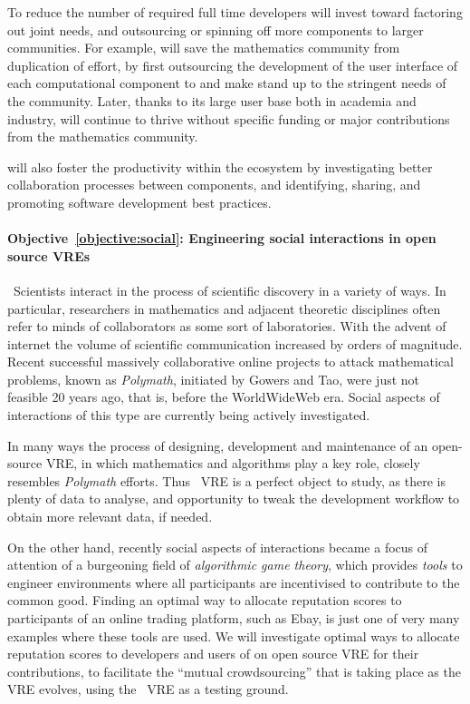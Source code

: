\documentclass[noworkareas,deliverables,\classoptions]{euproposal}       %
\begin{document}
\begin{proposal}

To reduce the number of required full time developers \TheProject will
invest toward factoring out joint needs, and outsourcing or spinning
off more components to larger communities.
%
For example, \TheProject will save the mathematics community from
duplication of effort, by first outsourcing the development of the user
interface of each computational component to \Jupyter and make
\Jupyter stand up to the stringent needs of the community.  Later,
thanks to its large user base both in academia and industry, \Jupyter
will continue to thrive without specific funding or major
contributions from the mathematics community.

\TheProject will also foster the productivity within the ecosystem by
investigating better collaboration processes between components, and
identifying, sharing, and promoting software development best
practices.

\paragraph{Objective~\ref{objective:social}: Engineering social interactions in open source VREs}\
Scientists interact in the process of scientific discovery in a variety of ways.
In particular, researchers in mathematics and adjacent theoretic disciplines often refer
to minds of collaborators as some sort of laboratories. With the advent of internet
the volume of scientific communication increased by orders of magnitude. Recent
successful massively collaborative online projects to attack mathematical 
problems, known as \emph{Polymath}, initiated by Gowers and Tao, were just not 
feasible 20 years ago, that is, before the WorldWideWeb era.
Social aspects of interactions of this type are currently being actively investigated.

In many ways the process of designing, development and maintenance of an open-source VRE, in which mathematics
and algorithms play a key role, closely resembles \emph{Polymath} efforts.
Thus \TheProject\ VRE is a perfect object to study, as there is plenty of data to analyse, and 
opportunity to tweak the development workflow to obtain more relevant data, if needed.

On the other hand, recently social aspects of interactions became a focus of attention
of a burgeoning field of \emph{algorithmic game theory}, which provides \emph{tools} to engineer 
environments where all participants are incentivised to contribute to the common good.
Finding an optimal way to allocate reputation scores to participants of
an online trading platform, such as Ebay, is just one of very many examples where
these tools are used. We will investigate optimal ways to allocate reputation scores to 
developers and users of on open source VRE for their contributions, to facilitate
the ``mutual crowdsourcing'' that is taking place as the VRE evolves, using the \TheProject\ VRE
as a testing ground.


\end{proposal}
\end{document}

